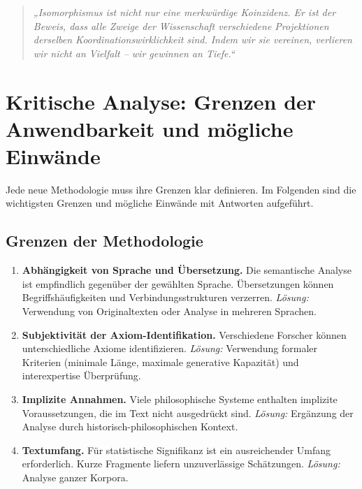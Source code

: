 \documentclass[12pt,a4paper]{article}
\begin{document}
	\begin{quote}
		\itshape
		„Isomorphismus ist nicht nur eine merkwürdige Koinzidenz. Er ist der Beweis, dass alle Zweige der Wissenschaft verschiedene Projektionen derselben Koordinationswirklichkeit sind. Indem wir sie vereinen, verlieren wir nicht an Vielfalt – wir gewinnen an Tiefe.“
	\end{quote}
	
	
	\section{Kritische Analyse: Grenzen der Anwendbarkeit und mögliche Einwände}
	\label{sec:critical-analysis}
	
	Jede neue Methodologie muss ihre Grenzen klar definieren. Im Folgenden sind die wichtigsten Grenzen und mögliche Einwände mit Antworten aufgeführt.
	
	\subsection{Grenzen der Methodologie}
	
	\begin{enumerate}
		\item \textbf{Abhängigkeit von Sprache und Übersetzung.} Die semantische Analyse ist empfindlich gegenüber der gewählten Sprache. Übersetzungen können Begriffshäufigkeiten und Verbindungsstrukturen verzerren. \textit{Lösung:} Verwendung von Originaltexten oder Analyse in mehreren Sprachen.
		\item \textbf{Subjektivität der Axiom-Identifikation.} Verschiedene Forscher können unterschiedliche Axiome identifizieren. \textit{Lösung:} Verwendung formaler Kriterien (minimale Länge, maximale generative Kapazität) und interexpertise Überprüfung.
		\item \textbf{Implizite Annahmen.} Viele philosophische Systeme enthalten implizite Voraussetzungen, die im Text nicht ausgedrückt sind. \textit{Lösung:} Ergänzung der Analyse durch historisch-philosophischen Kontext.
		\item \textbf{Textumfang.} Für statistische Signifikanz ist ein ausreichender Umfang erforderlich. Kurze Fragmente liefern unzuverlässige Schätzungen. \textit{Lösung:} Analyse ganzer Korpora.
	\end{enumerate}
	
\end{document}
